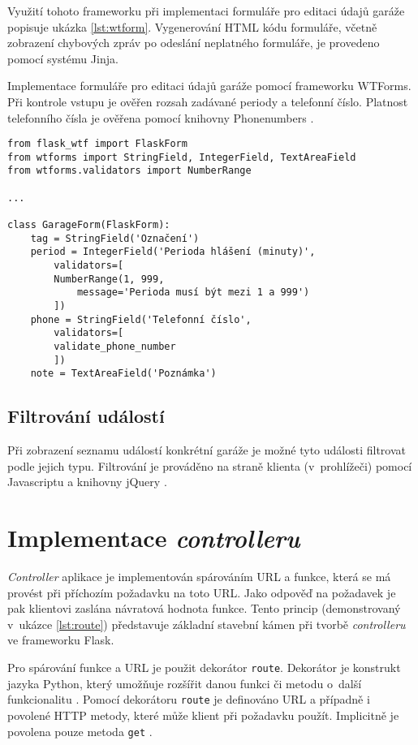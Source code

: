 Využití tohoto frameworku při implementaci formuláře pro editaci údajů garáže popisuje ukázka \ref{lst:wtform}. Vygenerování HTML kódu formuláře, včetně zobrazení chybových zpráv po odeslání neplatného formuláře, je provedeno pomocí systému Jinja.

\begin{listing}[htbp]
\caption{\label{lst:wtform} Implementace formuláře pro editaci údajů garáže pomocí frameworku WTForms. Při kontrole vstupu je ověřen rozsah zadávané periody a telefonní číslo. Platnost telefonního čísla je ověřena pomocí knihovny Phonenumbers \cite{phonenumbers}.}
\begin{verbatim}
from flask_wtf import FlaskForm
from wtforms import StringField, IntegerField, TextAreaField
from wtforms.validators import NumberRange

...

class GarageForm(FlaskForm):
    tag = StringField('Označení')
    period = IntegerField('Perioda hlášení (minuty)', 
        validators=[
        NumberRange(1, 999, 
            message='Perioda musí být mezi 1 a 999')
        ])
    phone = StringField('Telefonní číslo', 
        validators=[
        validate_phone_number
        ])
    note = TextAreaField('Poznámka')
\end{verbatim}
\end{listing}

\subsection{Filtrování událostí}

Při zobrazení seznamu událostí konkrétní garáže je možné tyto události filtrovat podle jejich typu. Filtrování je prováděno na straně klienta (v~prohlížeči) pomocí Javascriptu a knihovny jQuery \cite{jquery_about}.

\section{Implementace \textit{controlleru}}
\label{sec:im_controller}

\textit{Controller} aplikace je implementován spárováním URL a funkce, která se má provést při příchozím požadavku na toto URL. Jako odpověď na požadavek je pak klientovi zaslána návratová hodnota funkce. Tento princip (demonstrovaný v~ukázce \ref{lst:route}) představuje základní stavební kámen při tvorbě \textit{controlleru} ve frameworku Flask.

Pro spárování funkce a URL je použit dekorátor \texttt{route}. Dekorátor je konstrukt jazyka Python, který umožňuje rozšířit danou funkci či metodu o~další funkcionalitu \cite{python_decorators}. Pomocí dekorátoru \texttt{route} je definováno URL a případně i povolené HTTP metody, které může klient při požadavku použít. Implicitně je povolena pouze metoda \texttt{get} \cite{flask_api}. 

